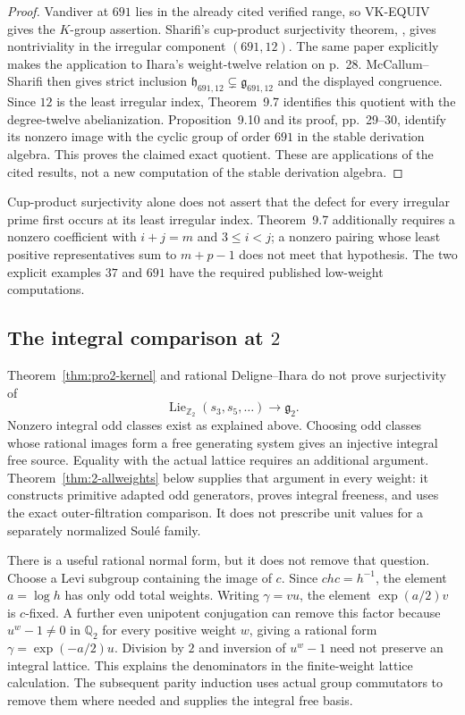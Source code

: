 \documentclass[11pt,a4paper]{article}
\theoremstyle{definition}
\begin{document}
\begin{proof}
Vandiver at $691$ lies in the already cited verified range, so
VK-EQUIV gives the $K$-group assertion. Sharifi's cup-product
surjectivity theorem, \cite[Theorem~1.2, p.~2; Corollary~5.9,
p.~27]{Sharifi2007}, gives nontriviality in the irregular component
$(691,12)$. The same paper explicitly makes the application to
Ihara's weight-twelve relation on p.~28.
McCallum--Sharifi \cite[Theorem~9.11, p.~30]{McCallumSharifi2003}
then gives strict inclusion $\mathfrak h_{691,12}\subsetneq
\mathfrak g_{691,12}$ and the displayed congruence. Since $12$ is
the least irregular index, Theorem~9.7 identifies this quotient
with the degree-twelve abelianization. Proposition~9.10 and its
proof, pp.~29--30, identify its nonzero image with the cyclic
group of order $691$ in the stable derivation algebra. This proves
the claimed exact quotient. These are applications of the cited
results, not a new computation of the stable derivation algebra.
\end{proof}

Cup-product surjectivity alone does not assert that the defect for
every irregular prime first occurs at its least irregular index.
Theorem~9.7 additionally requires a nonzero coefficient with
$i+j=m$ and $3\le i<j$; a nonzero pairing whose least positive
representatives sum to $m+p-1$ does not meet that hypothesis.
The two explicit examples $37$ and $691$ have the required
published low-weight computations.

\subsection{The integral comparison at \texorpdfstring{$2$}{2}}

Theorem~\ref{thm:pro2-kernel} and rational Deligne--Ihara do not prove surjectivity of
\[
 \operatorname{Lie}_{\mathbb Z_2}(s_3,s_5,\ldots)
      \longrightarrow\mathfrak g_2.
\]
Nonzero integral odd classes exist as explained above. Choosing odd classes whose rational images form a free generating system gives an injective integral free source. Equality with the actual lattice requires an additional argument. Theorem~\ref{thm:2-allweights} below supplies that argument in every weight: it constructs primitive adapted odd generators, proves integral freeness, and uses the exact outer-filtration comparison. It does not prescribe unit values for a separately normalized Soul\'e family.

There is a useful rational normal form, but it does not remove that question. Choose a Levi subgroup containing the image of $c$. Since $chc=h^{-1}$, the element $a=\log h$ has only odd total weights. Writing $\gamma=vu$, the element $\exp(a/2)v$ is $c$-fixed. A further even unipotent conjugation can remove this factor because $u^w-1\neq0$ in $\mathbb Q_2$ for every positive weight $w$, giving a rational form $\gamma=\exp(-a/2)u$. Division by $2$ and inversion of $u^w-1$ need not preserve an integral lattice. This explains the denominators in the finite-weight lattice calculation. The subsequent parity induction uses actual group commutators to remove them where needed and supplies the integral free basis.
\end{document}
